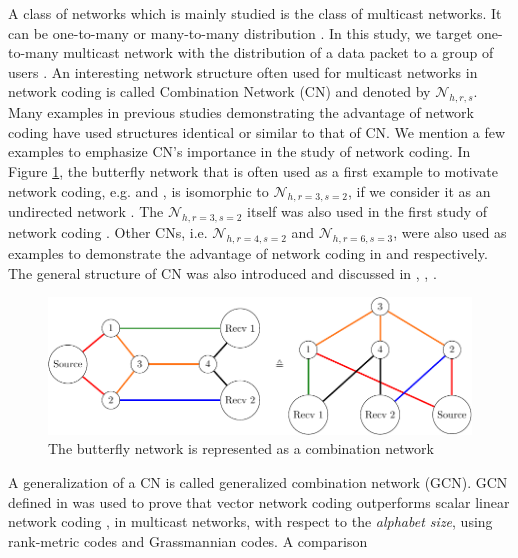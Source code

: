 A class of networks which is mainly studied is the class of multicast
networks. It can be one-to-many or many-to-many distribution \cite{Harte:2008}.
In this study, we target one-to-many multicast network with the distribution
of a data packet to a group of users \cite{Zhang:2012}. An interesting
network structure often used for multicast networks in network coding
is called Combination Network (CN) and denoted by $\mathcal{N}_{h,r,s}$.
Many examples in previous studies demonstrating the advantage of network
coding have used structures identical or similar to that of CN. We
mention a few examples to emphasize CN's importance in the study of
network coding. In Figure \ref{fig:butterfly_nw_cn}, the butterfly
network that is often used as a first example to motivate network
coding, e.g. \cite[Fig. 7]{Ahlswede:2000} and \cite[Fig. 1]{Sanders:2003},
is isomorphic to $\mathcal{N}_{h,r=3,s=2}$, if we consider it as
an undirected network \cite{Maheshwar:2012}. The $\mathcal{N}_{h,r=3,s=2}$
itself was also used in the first study of network coding \cite{Ahlswede:2000}.
Other CNs, i.e. $\mathcal{N}_{h,r=4,s=2}$ and $\mathcal{N}_{h,r=6,s=3}$,
were also used as examples to demonstrate the advantage of network
coding in \cite[Fig. 2]{Sanders:2003} and \cite[Fig. 2]{Jaggi:2005}
respectively. The general structure of CN was also introduced and
discussed in \cite[Sec. 4.3]{Fragouli:2006}, \cite[Sec. 4.1]{Yeung:2006},
\cite{Ngai:2004,Xiao:2007}.
\begin{figure}[H]
\caption{The butterfly network is represented as a combination network \label{fig:butterfly_nw_cn}}

\centering{}\includegraphics[width=0.5\paperwidth]{./figures/ahlswede_butterfly_network_CN}
\end{figure}
A generalization of a CN \cite{Riis:2006} is called generalized combination
network (GCN). GCN defined in \cite{Etzion:2016,Wachter-Zeh:2018}
was used to prove that vector network coding outperforms scalar linear
network coding , in multicast networks, with respect to the \textit{alphabet
size}, using rank-metric codes and Grassmannian codes. A comparison
